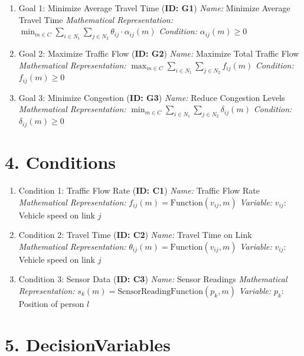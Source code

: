 \documentclass{article}
\begin{document}
\begin{enumerate}[label=\arabic*.]
    \item Goal 1: Minimize Average Travel Time (\textbf{ID: G1})
        \textit{Name:} Minimize Average Travel Time
        \textit{Mathematical Representation:} $\min_{m \in C} \sum_{i \in N_1} \sum_{j \in N_2} \theta_{ij} \cdot \alpha_{ij}(m)$
        \textit{Condition:}  $\alpha_{ij}(m) \ge 0$

    \item Goal 2: Maximize Traffic Flow (\textbf{ID: G2})
        \textit{Name:} Maximize Total Traffic Flow
        \textit{Mathematical Representation:} $\max_{m \in C} \sum_{i \in N_1} \sum_{j \in N_2} f_{ij}(m)$
        \textit{Condition:}  $f_{ij}(m) \ge 0$

    \item Goal 3: Minimize Congestion (\textbf{ID: G3})
        \textit{Name:} Reduce Congestion Levels
        \textit{Mathematical Representation:} $\min_{m \in C} \sum_{i \in N_1} \sum_{j \in N_2} \delta_{ij}(m)$
        \textit{Condition:}  $\delta_{ij}(m) \ge 0$
\end{enumerate}

\section{4. Conditions}
\label{sec:conditions}

\begin{enumerate}[label=\arabic*.]
    \item Condition 1: Traffic Flow Rate (\textbf{ID: C1})
        \textit{Name:} Traffic Flow Rate
        \textit{Mathematical Representation:} $f_{ij}(m) = \text{Function}(v_{ij}, m)$
        \textit{Variable:} $v_{ij}$: Vehicle speed on link $j$

    \item Condition 2: Travel Time (\textbf{ID: C2})
        \textit{Name:}  Travel Time on Link
        \textit{Mathematical Representation:} $\theta_{ij}(m) = \text{Function}(v_{ij}, m)$
        \textit{Variable:} $v_{ij}$: Vehicle speed on link $j$

    \item Condition 3: Sensor Data (\textbf{ID: C3})
        \textit{Name:} Sensor Readings
        \textit{Mathematical Representation:} $s_k(m) = \text{SensorReadingFunction}(p_k, m)$
        \textit{Variable:} $p_k$: Position of person $l$
\end{enumerate}

\section{5. DecisionVariables}
\label{sec:decisionvariables}
\end{document}
